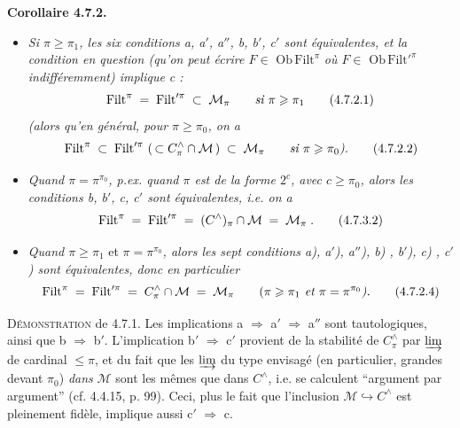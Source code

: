 \textbf{Corollaire 4.7.2.}
\begin{itemize}[leftmargin=4em]
\item[\textit{1°)}] \textit{Si $\pi \geqslant \pi_1$, les six conditions a, a$'$, a$''$, b, b$'$, c$'$ sont équivalentes, et la condition en question (qu'on peut écrire $F \in$} $\mathrm{Ob}\,\mathrm{Filt}^{\pi}$ \textit{où $F \in$} $\mathrm{Ob}\,\mathrm{Filt}'^{\pi}$ \textit{indifféremment) implique c :} %
\[
\mathrm{Filt}^{\pi} \;=\; \mathrm{Filt}'^{\pi} \;\subset\; \mathcal{M}_{\pi} \qquad \textit{si } \pi \geqslant \pi_1 \tag*{(4.7.2.1)}
\]
\textit{(alors qu'en général, pour $\pi \geqslant \pi_0$, on a}
\[
\mathrm{Filt}^{\pi} \;\subset\; \mathrm{Filt}'^{\pi}\ (\,\subset C^{\wedge}_{\pi} \cap \mathcal{M}\,) \;\subset\; \mathcal{M}_{\pi} \qquad \textit{si } \pi \geqslant \pi_0\textit{).} \tag*{(4.7.2.2)}
\]
\item[\textit{2°)}] \textit{Quand $\pi = \pi^{\pi_0}$, p.ex. quand $\pi$ est de la forme $2^{c}$, avec $c \geqslant \pi_0$, alors les conditions b, b$'$, c, c$'$ sont équivalentes, i.e. on a}
\[
\mathrm{Filt}^{\pi} \;=\; \mathrm{Filt}'^{\pi} \;=\; (C^{\wedge})_{\pi} \cap \Mc \;=\; \Mc_{\pi}\;. \tag*{(4.7.3.2)} %
\]
\item[\textit{3°)}] \textit{Quand $\pi \geqslant \pi_1$} et \textit{$\pi = \pi^{\pi_0}$, alors les sept conditions a), a$'$), a$''$), b) , b$'$), c) , c$'$) sont équivalentes, donc en particulier}
\[
\mathrm{Filt}^{\pi} \;=\; \mathrm{Filt}'^{\pi} \;=\; C^{\wedge}_{\pi} \cap \mathcal{M} \;=\; \mathcal{M}_{\pi} \qquad (\pi \geqslant \pi_1 \textit{ et } \pi = \pi^{\pi_0}\textit{).} \tag*{(4.7.2.4)}
\]
\end{itemize}


\textsc{Démonstration} de 4.7.1. Les implications a $\Longrightarrow$ a$'$ $\Longrightarrow$ a$''$ sont tautologiques, ainsi que b $\Longrightarrow$ b$'$. L’implication b$'$ $\Longrightarrow$ c$'$ provient de la stabilité de $C^{\wedge}_{\pi}$ par $\varinjlim$ de cardinal $\leqslant \pi$, et du fait que les $\varinjlim$ du type envisagé (en particulier, grandes devant $\pi_0$) \textit{dans} $\mathcal{M}$ sont les mêmes que dans $C^{\wedge}$, i.e. se calculent “argument par argument” (cf. 4.4.15, p. 99). Ceci, plus le fait que l’inclusion $\mathcal{M} \hookrightarrow C^{\wedge}$ est pleinement fidèle, implique aussi c$'$ $\Longrightarrow$ c.

